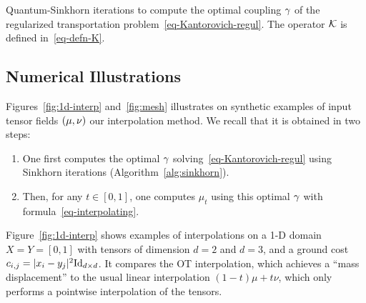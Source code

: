 \begin{algorithm}[t]
\fbox{\hspace{-.1in}\parbox{\columnwidth}{%
\begin{algorithmic}
\Function{Quantum-Sinkhorn}{$\mu,\nu,c,\epsilon,\rho_1,\rho_2$}
	\algspace
	\State $\foralls k=1,2, \quad \tau_k \in ]0,\tfrac{2 \epsilon}{\epsilon+\rho_k}[$, 
	\Let{$\foralls (i,j) \in I \times J, \quad (u_i,v_j)$}{$(0_{d \times d}, 0_{d \times d})$}
	\For{$s=1,2,3,\ldots$}
		\Let{$K$}{$\Kern(u,v)$}
		\State $\foralls i \in I, \quad u_i \RelaxAssign{\tau_1} \LSE_j(K_{i,j})-\log(\mu_i)$
		\Let{$K$}{$\Kern(u,v)$}
		\State $\foralls j \in J, \quad v_j \RelaxAssign{\tau_2} \LSE_i(K_{i,j})-\log(\nu_j)$
	\EndFor
	\State\Return{$(\ga_{i,j} = \exp(K_{i,j}))_{i,j}$}
\EndFunction
  \end{algorithmic}
}}
\caption{Quantum-Sinkhorn iterations to compute the optimal coupling $\gamma$ of the regularized transportation problem~\eqref{eq-Kantorovich-regul}. The operator $\mathcal{K}$ is defined in~\eqref{eq-defn-K}.\label{alg:sinkhorn}}
\end{algorithm}


\subsection{Numerical Illustrations}
\label{sec-numerics-interp}

Figures~\ref{fig:1d-interp} and~\ref{fig:mesh} illustrates on synthetic examples of input tensor fields $(\mu,\nu)$ our interpolation method. We recall that it is obtained in two steps:
\begin{enumerate}
	\item One first computes the optimal $\gamma$ solving~\eqref{eq-Kantorovich-regul} using Sinkhorn iterations (Algorithm~\ref{alg:sinkhorn}).
	\item Then, for any $t \in [0,1]$, one computes $\mu_t$ using this optimal $\gamma$ with formula~\eqref{eq-interpolating}.
\end{enumerate}
   
Figure~\ref{fig:1d-interp} shows examples of interpolations on a 1-D domain $X=Y=[0,1]$ with tensors of dimension $d=2$ and $d=3$, and a ground cost $c_{i,j}=|x_i-y_j|^2\mathrm{Id}_{d \times d}$. It compares the OT interpolation, which achieves a ``mass displacement'' to the usual linear interpolation $(1-t)\mu+t\nu$, which only performs a pointwise interpolation of the tensors. 

